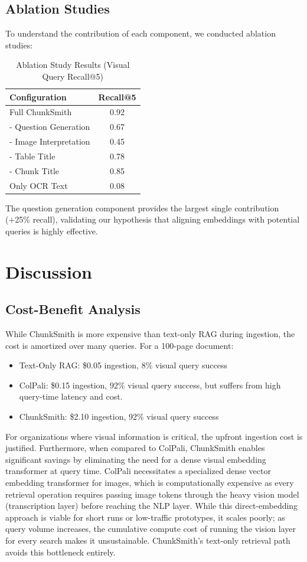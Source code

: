 \documentclass[conference]{IEEEtran}
\begin{document}
\subsection{Ablation Studies}
To understand the contribution of each component, we conducted ablation studies:
\begin{table}[h]
\centering
\caption{Ablation Study Results (Visual Query Recall@5)}
\begin{tabular}{@{}lc@{}}
\toprule
\textbf{Configuration} & \textbf{Recall@5} \\ \midrule
Full ChunkSmith & 0.92 \\
- Question Generation & 0.67 \\
- Image Interpretation & 0.45 \\
- Table Title & 0.78 \\
- Chunk Title & 0.85 \\
Only OCR Text & 0.08 \\ \bottomrule
\end{tabular}
\label{tab:ablation}
\end{table}
The question generation component provides the largest single contribution (+25\% recall), validating our hypothesis that aligning embeddings with potential queries is highly effective.

\section{Discussion}
\subsection{Cost-Benefit Analysis}
While ChunkSmith is more expensive than text-only RAG during ingestion, the cost is amortized over many queries. For a 100-page document:
\begin{itemize}
    \item Text-Only RAG: \$0.05 ingestion, 8\% visual query success
    \item ColPali: \$0.15 ingestion, 92\% visual query success, but suffers from high query-time latency and cost.
    \item ChunkSmith: \$2.10 ingestion, 92\% visual query success
\end{itemize}
For organizations where visual information is critical, the upfront ingestion cost is justified. Furthermore, when compared to ColPali, ChunkSmith enables significant savings by eliminating the need for a dense visual embedding transformer at query time. ColPali necessitates a specialized dense vector embedding transformer for images, which is computationally expensive as every retrieval operation requires passing image tokens through the heavy vision model (transcription layer) before reaching the NLP layer. While this direct-embedding approach is viable for short runs or low-traffic prototypes, it scales poorly; as query volume increases, the cumulative compute cost of running the vision layer for every search makes it unsustainable. ChunkSmith's text-only retrieval path avoids this bottleneck entirely.
\end{document}
